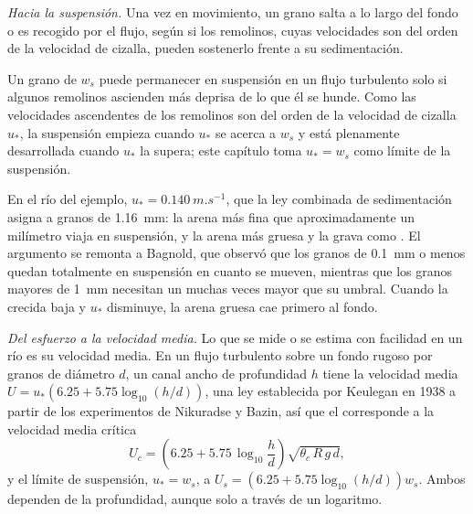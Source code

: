 \emph{Hacia la suspensión.} Una vez en movimiento, un grano salta a lo largo del fondo o es recogido por el flujo, según si los remolinos, cuyas velocidades son
del orden de la velocidad de cizalla, pueden sostenerlo frente a su sedimentación.

\begin{proposition}\label{prop:b1:erosion-transport:suspension}
Un grano de  $w_s$ puede permanecer en suspensión en un flujo turbulento solo si algunos remolinos ascienden más deprisa de lo que
él se hunde. Como las velocidades ascendentes de los remolinos son del orden de la velocidad de cizalla $u_*$, la suspensión empieza cuando $u_*$ se acerca a $w_s$
y está plenamente desarrollada cuando $u_*$ la supera; este capítulo toma $u_* = w_s$ como límite de la suspensión.
\end{proposition}
\admitted

En el río del ejemplo, $u_* = \qty{0.140}{m.s^{-1}}$, que la ley combinada de sedimentación asigna a granos de \qty{1.16}{mm}: la arena más fina que
aproximadamente un milímetro viaja en suspensión, y la arena más gruesa y la grava como . El argumento se remonta a Bagnold, que observó que
los granos de \qty{0.1}{mm} o menos quedan totalmente en suspensión en cuanto se mueven, mientras que los granos mayores de \qty{1}{mm} necesitan un  muchas veces mayor que su umbral. Cuando la crecida baja y $u_*$ disminuye, la arena gruesa cae primero al fondo.

\emph{Del esfuerzo a la velocidad media.} Lo que se mide o se estima con facilidad en un río es su velocidad media. En un flujo turbulento sobre un fondo rugoso
por granos de diámetro $d$, un canal ancho de profundidad $h$ tiene la velocidad media
$U = u_*\left(6.25 + 5.75\log_{10}(h/d)\right)$, una ley establecida por Keulegan en 1938 a partir de los experimentos de Nikuradse y Bazin, así que el  corresponde a la velocidad media crítica
\[
  U_c = \left(6.25 + 5.75\,\log_{10}\frac{h}{d}\right)\sqrt{\theta_c\,R\,g\,d},
\]
y el límite de suspensión, $u_* = w_s$, a $U_s = \left(6.25 +
5.75\log_{10}(h/d)\right) w_s$. Ambos dependen de la profundidad, aunque solo a través de un logaritmo.

